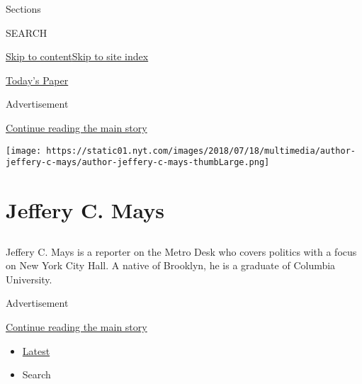 Sections

SEARCH

\protect\hyperlink{site-content}{Skip to
content}\protect\hyperlink{site-index}{Skip to site index}

\href{https://myaccount.nytimes.com/auth/login?response_type=cookie\&client_id=vi}{}

\href{https://www.nytimes.com/section/todayspaper}{Today's Paper}

Advertisement

\protect\hyperlink{after-top}{Continue reading the main story}

\texttt{[image: https://static01.nyt.com/images/2018/07/18/multimedia/author-jeffery-c-mays/author-jeffery-c-mays-thumbLarge.png]}

\hypertarget{jeffery-c-mays}{%
\section{Jeffery C. Mays}\label{jeffery-c-mays}}

\subsection{}

Jeffery C. Mays is a reporter on the Metro Desk who covers politics with
a focus on New York City Hall. A native of Brooklyn, he is a graduate of
Columbia University.

Advertisement

\protect\hyperlink{after-mid1}{Continue reading the main story}

\begin{itemize}
\tightlist
\item
  \protect\hyperlink{stream-panel}{Latest}
\item
  Search
\end{itemize}

